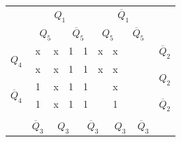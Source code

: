 \documentclass[a4paper,14pt]{article}
\begin{document}
\begin{table}[H]
\begin{minipage}{.5\linewidth}
\begin{tabular}{cccccccccc}
\end{tabular}
	\end{minipage}%
	\begin{minipage}{.5\linewidth}
		\centering
\begin{tabular}{cccccccccc}
	& \multicolumn{4}{c}{$Q_1$}                                                                         & \multicolumn{4}{c}{$\overline{Q}_1$}                                                            &                        \\
	& \multicolumn{2}{c}{$Q_5$}                       & \multicolumn{2}{c}{$\overline{Q}_5$}            & \multicolumn{2}{c}{$Q_5$}                       & \multicolumn{2}{c}{$\overline{Q}_5$}          &                        \\ \cline{2-9}
	\multicolumn{1}{c|}{\multirow{2}{*}{$Q_4$}}            & \multicolumn{1}{c|}{x} & \multicolumn{1}{c|}{x} & \multicolumn{1}{c|}{1} & \multicolumn{1}{c|}{1} & \multicolumn{1}{c|}{x} & \multicolumn{1}{c|}{x} & \multicolumn{1}{c|}{} & \multicolumn{1}{c|}{} & $\overline{Q}_2$       \\ \cline{2-9}
	\multicolumn{1}{c|}{}                                  & \multicolumn{1}{c|}{x} & \multicolumn{1}{c|}{x} & \multicolumn{1}{c|}{1} & \multicolumn{1}{c|}{1} & \multicolumn{1}{c|}{x} & \multicolumn{1}{c|}{x} & \multicolumn{1}{c|}{} & \multicolumn{1}{c|}{} & \multirow{2}{*}{$Q_2$} \\ \cline{2-9}
	\multicolumn{1}{c|}{\multirow{2}{*}{$\overline{Q}_4$}} & \multicolumn{1}{c|}{1} & \multicolumn{1}{c|}{x} & \multicolumn{1}{c|}{1} & \multicolumn{1}{c|}{1} & \multicolumn{1}{c|}{}  & \multicolumn{1}{c|}{x} & \multicolumn{1}{c|}{} & \multicolumn{1}{c|}{} &                        \\ \cline{2-9}
	\multicolumn{1}{c|}{}                                  & \multicolumn{1}{c|}{1} & \multicolumn{1}{c|}{x} & \multicolumn{1}{c|}{1} & \multicolumn{1}{c|}{1} & \multicolumn{1}{c|}{}  & \multicolumn{1}{c|}{1} & \multicolumn{1}{c|}{} & \multicolumn{1}{c|}{} & $\overline{Q}_2$       \\ \cline{2-9}
	&                        & \multicolumn{2}{c}{}                            & \multicolumn{2}{c}{}                            & \multicolumn{2}{c}{}                           &                       &                        \\
	& $\overline{Q}_3$       & \multicolumn{2}{c}{$Q_3$}                       & \multicolumn{2}{c}{$\overline{Q}_3$}            & \multicolumn{2}{c}{$Q_3$}                      & $\overline{Q}_3$      &                       
\end{tabular}
	\end{minipage} 
\end{table}
\end{document}
